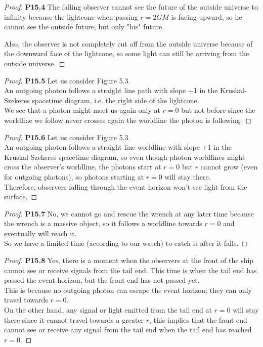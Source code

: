 \documentclass[11pt]{article}
\theoremstyle{definition}
\begin{document}
\cleardoublepage
\begin{proof}{\textbf{P15.4}}
The falling observer cannot see the future of the outside universe to infinity
because the lightcone when passing $r = 2GM$ is facing upward, so he cannot see
the outside future, but only "his" future.

Also, the observer is not completely cut off from the outside universe because
of the downward face of the lightcone, so some light can still be arriving from
the outside universe.
\end{proof}
\begin{proof}{\textbf{P15.5}}
Let us consider Figure 5.3.
\\
An outgoing photon follows a straight line path with slope +1 in the
Kruskal-Szekeres spacetime diagram, i.e. the right side of the lightcone.
\\
We see that a photon might meet us again only at $r = 0$ but not before since
the worldline we follow never crosses again the worldline the photon is following.
\end{proof}
\begin{proof}{\textbf{P15.6}}
Let us consider Figure 5.3.
\\
An outgoing photon follows a straight line worldline with slope +1 in the
Kruskal-Szekeres spacetime diagram, so even though photon worldlines might
cross the observer's worldline, the photons start at $r=0$ but $r$ cannot
grow (even for outgoing photons), so photons starting at $r=0$ will stay there.
\\
Therefore, observers falling through the event horizon won't see light from
the surface.
\end{proof}
\begin{proof}{\textbf{P15.7}}
No, we cannot go and rescue the wrench at any later time because the wrench
is a massive object, so it follows a worldline towards $r=0$ and eventually
will reach it.
\\
So we have a limited time (according to our watch) to catch it after it falls.
\end{proof}
\begin{proof}{\textbf{P15.8}}
Yes, there is a moment when the observers at the front of the ship cannot see
or receive signals from the tail end. This time is when the tail end has passed
the event horizon, but the front end has not passed yet.
\\
This is because no outgoing photon can escape the event horizon; they can only
travel towards $r=0$. 
\\
On the other hand, any signal or light emitted from the tail end at $r = 0$
will stay there since it cannot travel towards a greater $r$, this implies 
that the front end cannot see or receive any signal from the tail end when
the tail end has reached $r = 0$.
\end{proof}
\end{document}
